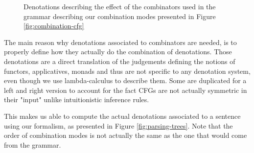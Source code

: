 \begin{figure}
	
	\caption{Denotations describing the effect of the combinators used in the
		grammar describing our combination modes presented in
		Figure \ref{fig:combination-cfg}}
	\label{fig:combinator-denotations}
\end{figure}

The main reason why denotations associated to combinators are needed, is to
properly define how they actually do the combination of denotations.
Those denotations are a direct translation of the judgements defining the
notions of functors, applicatives, monads and thus are not specific to any
denotation system, even though we use lambda-calculus to describe them.
Some are duplicated for a left and right version to account for the fact CFGs
are not actually symmetric in their "input" unlike intuitionistic inference
rules.

This makes us able to compute the actual denotations associated to a sentence
using our formalism, as presented in Figure \ref{fig:parsing-trees}.
Note that the order of combination modes is not actually the same as the one
that would come from the grammar.

